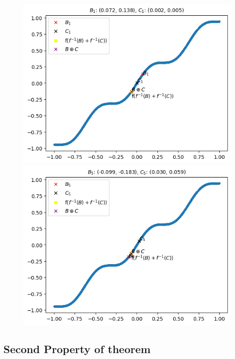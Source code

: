 \documentclass{report}
\begin{document}
            \begin{figure}[h]
                \centering
                \begin{minipage}{0.5\textwidth}
                    \centering
                    \includegraphics[width=0.9\linewidth]{./images/3.png}
                \end{minipage}%
                \begin{minipage}{0.5\textwidth}
                    \centering
                    \includegraphics[width=0.9\linewidth]{./images/4.png}
                \end{minipage}
            \end{figure}
            \newpage
    \subsection{Second Property of theorem}
\end{document}
